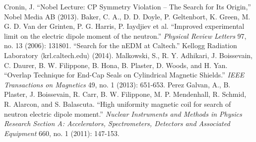 \documentclass[twocolumn,aps,prb,citeautoscript]{revtex4-1}
\begin{document}
\begin{thebibliography}{}
 Cronin, J. ``Nobel Lecture: CP Symmetry Violation – The Search
for Its Origin,'' Nobel Media AB (2013).
 Baker, C. A., D. D. Doyle, P. Geltenbort, K. Green, M. G. D. Van der Grinten, P. G. Harris, P. Iaydjiev et al. ``Improved experimental limit on the electric dipole moment of the neutron.'' \textit{Physical Review Letters} 97, no. 13 (2006): 131801.
 ``Search for the nEDM at Caltech.'' Kellogg Radiation Laboratory
$\langle$krl.caltech.edu$\rangle$ (2014).
 Malkowski, S., R. Y. Adhikari, J. Boissevain, C. Daurer, B. W. Filippone, B. Hona, B. Plaster, D. Woods, and H. Yan. ``Overlap Technique for End-Cap Seals on Cylindrical Magnetic Shields.'' \textit{IEEE Transactions on Magnetics} 49, no. 1 (2013): 651-653.
 Perez Galvan, A., B. Plaster, J. Boissevain, R. Carr, B. W. Filippone, M. P. Mendenhall, R. Schmid, R. Alarcon, and S. Balascuta. ``High uniformity magnetic coil for search of neutron electric dipole moment.'' \textit{Nuclear Instruments and Methods in Physics Research Section A: Accelerators, Spectrometers, Detectors and Associated Equipment} 660, no. 1 (2011): 147-153.
\end{thebibliography}
\end{document}
